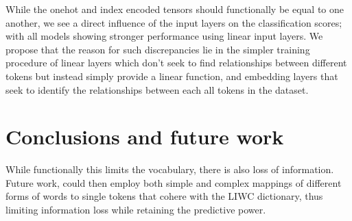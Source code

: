 While the onehot and index encoded tensors should functionally be equal to one another, we see a direct influence of the input layers on the classification scores; with all models showing stronger performance using linear input layers. We propose that the reason for such discrepancies lie in the simpler training procedure of linear layers which don't seek to find relationships between different tokens but instead simply provide a linear function, and embedding layers that seek to identify the relationships between each all tokens in the dataset.

\section{Conclusions and future work}

While functionally this limits the vocabulary, there is also loss of information. Future work, could then employ both simple and complex mappings of different forms of words to single tokens that cohere with the LIWC dictionary, thus limiting information loss while retaining the predictive power.

\zw{}
